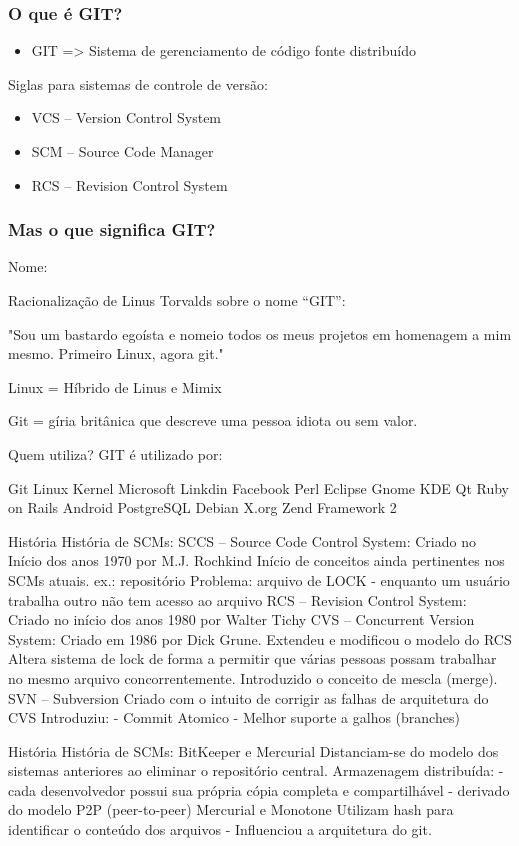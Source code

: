 \documentclass{beamer}
\begin{document}
\begin{frame}
\frametitle{O que é GIT?}

\begin{itemize}
\item GIT => Sistema de gerenciamento de código fonte distribuído
\end{itemize}

Siglas para sistemas de controle de versão:

\begin{itemize}
\item VCS – Version Control System
\item SCM – Source Code Manager
\item RCS – Revision Control System
\end{itemize}
\end{frame}

\begin{frame}
\frametitle{Mas o que significa GIT?}

Nome:

Racionalização de Linus Torvalds sobre o nome “GIT”:

"Sou um bastardo egoísta e nomeio todos os meus projetos em homenagem a mim mesmo. Primeiro Linux, agora git."

Linux = Híbrido de Linus e Mimix

Git = gíria britânica que descreve uma pessoa idiota ou sem valor.
\end{frame}

Quem utiliza?
GIT é utilizado por:

Git
Linux Kernel
Microsoft
Linkdin
Facebook
Perl
Eclipse
Gnome
KDE
Qt
Ruby on Rails
Android
PostgreSQL
Debian
X.org
Zend Framework 2

História
História de SCMs:
SCCS – Source Code Control System:
Criado no Início dos anos 1970 por M.J. Rochkind
Início de conceitos ainda pertinentes nos SCMs atuais. ex.: repositório
Problema: arquivo de LOCK
- enquanto um usuário trabalha outro não tem acesso ao arquivo
RCS – Revision Control System:
Criado no início dos anos 1980 por Walter Tichy
CVS – Concurrent Version System:
Criado em 1986 por Dick Grune.
Extendeu e modificou o modelo do RCS
Altera sistema de lock de forma a permitir que várias pessoas possam trabalhar
no mesmo arquivo concorrentemente. Introduzido o conceito de mescla (merge).
SVN – Subversion
Criado com o intuito de corrigir as falhas de arquitetura do CVS
Introduziu:
- Commit Atomico
- Melhor suporte a galhos (branches)

História
História de SCMs:
BitKeeper e Mercurial
Distanciam-se do modelo dos sistemas anteriores ao eliminar o repositório central.
Armazenagem distribuída:
- cada desenvolvedor possui sua própria cópia completa e compartilhável
- derivado do modelo P2P (peer-to-peer)
Mercurial e Monotone
Utilizam hash para identificar o conteúdo dos arquivos - Influenciou a arquitetura
do git.
\end{document}
